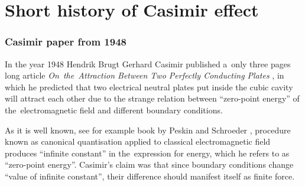 \documentclass[10pt,t]{beamer}
\begin{document}
\section{Short history of Casimir effect}



\begin{frame}
  \frametitle{Casimir paper from 1948}


  In the year 1948 Hendrik Brugt Gerhard Casimir published a~only three
  pages long article \textit{On~the~Attraction Between Two Perfectly
    Conducting Plates}
  \parencite{Casimir-On-the-Attraction-Between-ETC-Pub-1948}, in
  which he predicted that two electrical neutral plates put inside the
  cubic cavity will attract each other due to the strange relation between
  ``zero-point energy'' of the~electromagnetic field and different
  boundary conditions.

  As it is well known, see for example book by Peskin and Schroeder
  \parencite{Peskin-Schroeder-An-Introduction-to-Quantum-Field-Theory-Pub-1995},
  procedure known as canonical quantisation applied to classical
  electromagnetic field produces ``infinite constant'' in the~expression
  for energy, which he refers to as ``zero-point energy''. Casimir's claim
  was that since boundary conditions change ``value of infinite constant'',
  their difference should manifest itself as finite force.

\end{frame}
\end{document}
